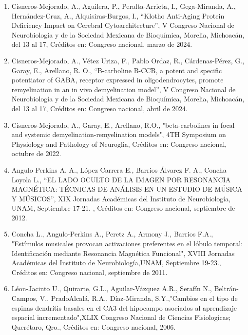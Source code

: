 \documentclass[12pt]{article}
\begin{document}
\begin{enumerate}
\item Cisneros-Mejorado, A., Aguilera, P., Peralta-Arrieta, I., Gega-Miranda, A., Hernández-Cruz, A., Alquisiras-Burgos, I., “Klotho 
Anti-Aging Protein Deficiency Impact on Cerebral Cytoarchitecture”, V Congreso Nacional de Neurobiología y de la Sociedad Mexicana de 
Bioquímica, Morelia, Michoacán, del 13 al 17, Créditos en: Congreso nacional, marzo de 2024.

\item Cisneros-Mejorado, A., Vétez Uriza, F., Pablo Ordaz, R., Cárdenas-Pérez, G., Garay, E., Arellano, R. O., “B-carboline B-CCB, a 
potent and specific potentiator of GABA, receptor expressed in oligodendrocytes, promote remyelination in 
an in vivo demyelination model”, V Congreso Nacional de Neurobiología y de la Sociedad Mexicana de Bioquímica, Morelia, Michoacán, del 
13 al 17, Créditos en: Congreso nacional, abril de 2024.

\item Cisneros-Mejorado, A., Garay, E., Arellano, R.O., "beta-carbolines in focal and systemic demyelination-remyelination models", 4TH 
Symposium on Physiology and Pathology of Neuroglia, Créditos en: Congreso nacional, octubre de 2022.

\item Angulo Perkins A. A., López Carrera E., Barrios Álvarez F. A., Concha Loyola L., “EL LADO OCULTO DE LA IMAGEN POR RESONANCIA 
MAGNÉTICA: TÉCNICAS DE ANÁLISIS EN UN ESTUDIO DE MÚSICA Y MÚSICOS”, XIX Jornadas Académicas del Instituto de Neurobiología, UNAM, 
Septiembre 17-21. , Créditos en: Congreso nacional, septiembre de 2012.

\item Concha L., Angulo-Perkins A., Peretz A., Armony J., Barrios F.A., "Estímulos musicales provocan activaciones preferentes en el 
lóbulo temporal: Identificación mediante Resonancia Magnética Funcional", XVIII Jornadas Académicas del Instituto de 
Neurobiología,UNAM, Septiembre 19-23., Créditos en: Congreso nacional, septiembre de 2011.

\item Léon-Jacinto U., Quirarte, G.L., Aguilar-Vázquez A.R., Serafín N., Beltrán-Campos, V., PradoAlcalá, R.A., Díaz-Miranda, 
S.Y.,"Cambios en el tipo de espinas dendrítis basales en el CA3 del hipocampo asociados al aprendizaje espacial incrementado",XLIX 
Congreso Nacional de Ciencias Fisiologicas; Querétaro, Qro., Créditos en: Congreso nacional, 2006.


\end{enumerate}
\end{document}
